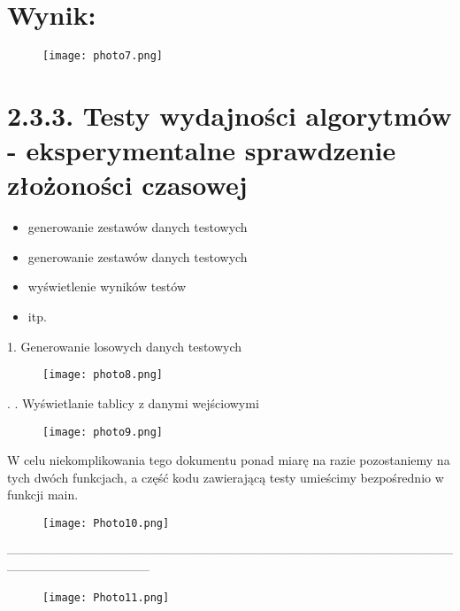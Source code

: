 \documentclass[a4paper,12pt]{article}
\begin{document}
	 \section{Wynik:}
	\vspace{-10mm}
	\begin{figure}[h!]
		\centering
		\texttt{[image: photo7.png]}
	\end{figure}
	\section{2.3.3. Testy wydajności algorytmów - eksperymentalne sprawdzenie złożoności czasowej}
		\begin{itemize}
		\item generowanie zestawów danych testowych
		\item generowanie zestawów danych testowych
		\item wyświetlenie wyników testów
		\item itp.
	\end{itemize}
	1. Generowanie losowych danych testowych \\
		\begin{figure}[h!]
		\centering
		\texttt{[image: photo8.png]}
	\end{figure}
	.
	. Wyświetlanie tablicy z danymi wejściowymi
	\begin{figure}[h!]
		\centering
		\texttt{[image: photo9.png]}
	\end{figure}
	\newpage
	W celu niekomplikowania tego dokumentu ponad miarę na razie pozostaniemy na tych dwóch funkcjach, a
	część kodu zawierającą testy umieścimy bezpośrednio w funkcji main.
	 \vspace{-1mm}
	\begin{figure}[h]
		\centering
		\texttt{[image: Photo10.png]}
	\end{figure}
	\newpage
	-----------------------------------------------------------------------------------------------------------------------------------------------
	\vspace{-15mm}
	\begin{figure}[h!]
		\centering
		\texttt{[image: Photo11.png]}
	\end{figure}
\end{document}
